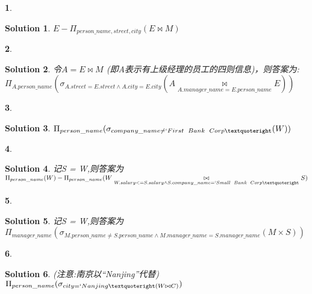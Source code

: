 \documentclass[UTF8,10pt,a4paper]{article}
\theoremstyle{Problem}
\newtheorem{prob}{}
\theoremstyle{Solution}
\newtheorem*{sol}{Solution}
\begin{document}
	\thispagestyle{FirstPageStyle}
	
	
	\begin{prob}
	\end{prob}
	
	\begin{sol} 
	$E-\Pi_{person\_name,street,city}(E \bowtie M)$
	\end{sol}
	
	\begin{prob}
	\end{prob}
	
	\begin{sol} 
		令$A = E \bowtie M$ (即A表示有上级经理的员工的四则信息)，则答案为:\\$\Pi_{A.person\_name}(\sigma_{A.street=E.street\land A.city=E.city}(A\underset{A.manager\_name=E.person\_name}{\bowtie} E))$
	\end{sol}
	
	\begin{prob}
	\end{prob}
	
	\begin{sol} 
		$\Pi_{person\_name}(\sigma_{company\_name \neq `First \hspace{0.5em}Bank\hspace{0.5em}Corp’}(W))$
	\end{sol}
	
	\begin{prob}
	\end{prob}
	
	\begin{sol} 
	记S = W,则答案为\\$\Pi_{person\_name}(W) - \Pi_{person\_name}(W \underset{W.salary <= S.salary \land S.company\_name=`Small\hspace{0.5em}Bank\hspace{0.5em}Corp’}{\bowtie} S)$
	\end{sol}
	
	\begin{prob}
	\end{prob}
	
	\begin{sol} 
	记S = W,则答案为\\$\Pi_{manager\_name}(\sigma_{M.person\_name\neq S.person\_name \land M.manager\_name = S.manager\_name}(M \times S))$
	\end{sol}
	
	\begin{prob}
	\end{prob}
	
	\begin{sol} 
	(注意:南京以``Nanjing''代替)\\
	$\Pi_{person\_name}(\sigma_{city=`Nanjing’(W \bowtie C)})$
	\end{sol}
\end{document}
